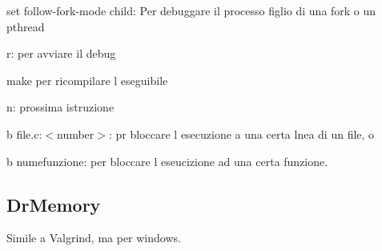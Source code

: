\begin{DoxyItemize}
\item {\ttfamily set follow-\/fork-\/mode child}\+: Per debuggare il processo figlio di una fork o un pthread
\item {\ttfamily r}\+: per avviare il debug
\item {\ttfamily make} per ricompilare l\textquotesingle{} eseguibile
\item {\ttfamily n}\+: prossima istruzione
\item {\ttfamily b file.\+c\+:$<$number$>$}\+: pr bloccare l\textquotesingle{} esecuzione a una certa lnea di un file, o
\item {\ttfamily b numefunzione}\+: per bloccare l\textquotesingle{} eseucizione ad una certa funzione.
\end{DoxyItemize}

\subsection*{Dr\+Memory}

Simile a Valgrind, ma per windows. 
